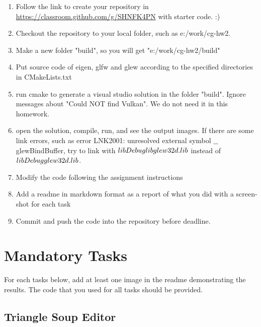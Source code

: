 \documentclass[11pt]{article}
\begin{document}
\begin{enumerate}
\item Follow the link to create your repository in \url{https://classroom.github.com/g/SHNFK4PN} with starter code. :)
\item Checkout the repository to your local folder, such as e:/work/cg-hw2. 
\item Make a new folder "build", so you will get "e:/work/cg-hw2/build"
\item Put source code of eigen, glfw and glew according to the specified directories in CMakeLists.txt
\item run cmake to generate a visual studio solution in the folder "build". Ignore messages about "Could NOT find Vulkan". We do not need it in this homework.
\item open the solution, compile, run, and see the output images. 
If there are some link errors, such as error LNK2001: unresolved external symbol \(\_\_\)glewBindBuffer, try to link with \(lib\\Debug\\libglew32d.lib\) instead of \(lib\\Debug\\glew32d.lib\).
\item Modify the code following the assignment instructions
\item Add a readme in markdown format as a report of what you did with a screen-shot for each task
\item Commit and push the code into the repository before deadline.
\end{enumerate}


\section{Mandatory Tasks}
For each tasks below, add at least one image in the readme demonstrating the results. The code that you used for all tasks should be provided.

\subsection{Triangle Soup Editor}
\end{document}
